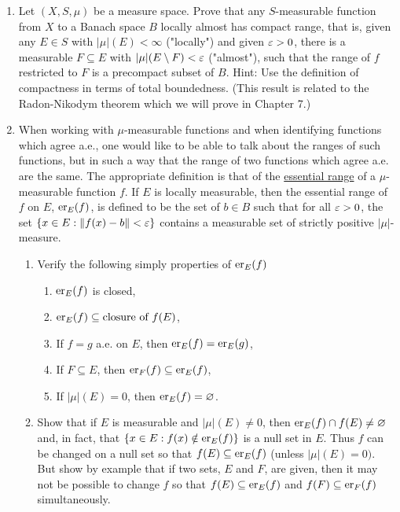 \begin{enumerate}[label=\arabic*),ref=\arabic*]
\item Let $(X, S, \mu)$ be a measure space. Prove that any $S$-measurable function from $X$ to a Banach space $B$ locally almost has compact range, that is, given any $E \in S$ with $|\mu|(E)<\infty$ ("locally") and given $\ep>0$, there is a measurable $F \subseteq E$ with $|\mu|(E\sd F)<\ep$ ("almost"), such that the range of $f$ restricted to $F$ is a precompact subset of $B$. Hint: Use the definition of compactness in terms of total boundedness. (This result is related to the Radon-Nikodym theorem which we will prove in Chapter 7.) %

\item \label{exer:essential range}
When working with $\mu$-measurable functions and when identifying functions which agree a.e., one would like to be able to talk about the ranges of such functions, but in such a way that the range of two functions which agree a.e. are the same. The appropriate definition is that of the \underline{essential range} of a $\mu$-measurable function $f$. If $E$ is locally measurable, then the essential range of $f$ on $E$, $\er{f}{E}$, is defined to be the set of $b \in B$ such that for all $\ep>0$, the set $\brc{x\in E:\norm{f(x)-b}<\ep}$ contains a measurable set of strictly positive $|\mu|$-measure. %
\begin{enumerate}
    \item Verify the following simply properties of $\er{f}{E}$
    \begin{enumerate}[label=\arabic*)]
        \item $\er{f}{E}$ is closed,
        \item $\er{f}{E}\subseteq\text{closure of }f(E)$,
        \item If $f=g$ a.e. on $E$, then $\er{f}{E}=\er{g}{E}$,
        \item If $F \subseteq E$, then $\er{f}{F}\subseteq\er{f}{E}$,
        \item If $|\mu|(E)=0$, then $\er{f}{E}=\varnothing$.
    \end{enumerate}
    
    \item Show that if $E$ is measurable and $|\mu|(E)\neq 0$, then $\er{f}{E}\cap f(E)\neq\varnothing$ and, in fact, that $\brc{x \in E: f(x)\notin\er{f}{E}}$ is a null set in $E$. Thus $f$ can be changed on a null set so that $f(E) \subseteq\er{f}{E}$ (unless $|\mu|(E)=0)$. But show by example that if two sets, $E$ and $F$, are given, then it may not be possible to change $f$ so that $f(E)\subseteq\er{f}{E}$ and $f(F)\subseteq\er{f}{F}$ simultaneously.
    

\end{enumerate}
\end{enumerate}
